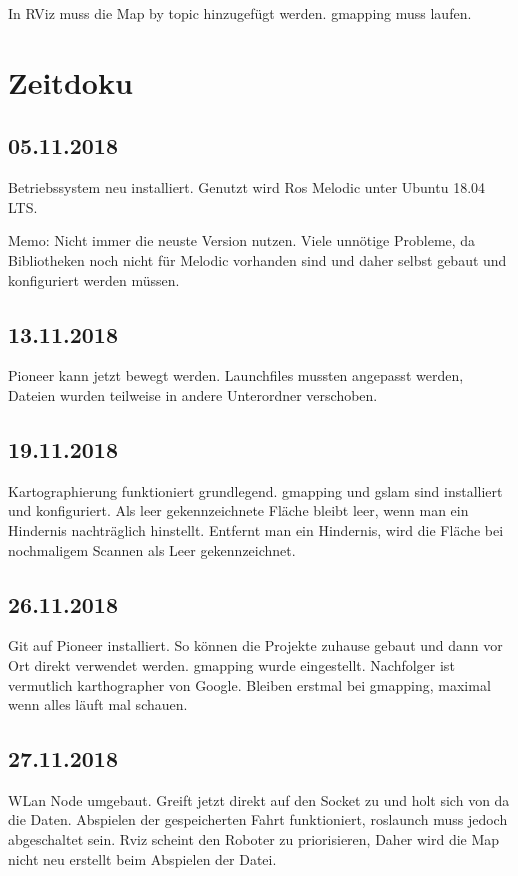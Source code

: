 \documentclass{scrartcl}%
\begin{document}
In RViz muss die Map by topic hinzugefügt werden. gmapping muss laufen.

\section{Zeitdoku}
\subsection{05.11.2018}
Betriebssystem neu installiert. Genutzt wird Ros Melodic unter Ubuntu 18.04 LTS.

Memo: Nicht immer die neuste Version nutzen. Viele unnötige Probleme, da Bibliotheken noch nicht für Melodic vorhanden sind und daher selbst gebaut und konfiguriert werden müssen.

\subsection{13.11.2018}
Pioneer kann jetzt bewegt werden. Launchfiles mussten angepasst werden, Dateien wurden teilweise in andere Unterordner verschoben.

\subsection{19.11.2018}
Kartographierung funktioniert grundlegend. gmapping und gslam sind installiert und konfiguriert. Als leer gekennzeichnete Fläche bleibt leer, wenn man ein Hindernis nachträglich hinstellt. Entfernt man ein Hindernis, wird die Fläche bei nochmaligem Scannen als Leer gekennzeichnet.

\subsection{26.11.2018}
Git auf Pioneer installiert. So können die Projekte zuhause gebaut und dann vor Ort direkt verwendet werden. gmapping wurde eingestellt. Nachfolger ist vermutlich karthographer von Google. Bleiben erstmal bei gmapping, maximal wenn alles läuft mal schauen.

\subsection{27.11.2018}
WLan Node umgebaut. Greift jetzt direkt auf den Socket zu und holt sich von da die Daten. Abspielen der gespeicherten Fahrt funktioniert, roslaunch muss jedoch abgeschaltet sein. Rviz scheint den Roboter zu priorisieren, Daher wird die Map nicht neu erstellt beim Abspielen der Datei.
\end{document}
